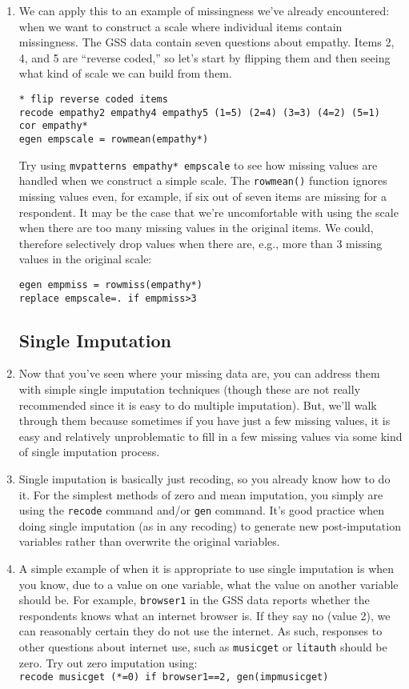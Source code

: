 \documentclass[a4paper,12pt]{article}
\begin{document}
\begin{enumerate}
\item We can apply this to an example of missingness we've already encountered: when we want to construct a scale where individual items contain missingness. The GSS data contain seven questions about empathy. Items 2, 4, and 5 are ``reverse coded,'' so let's start by flipping them and then seeing what kind of scale we can build from them.
\begin{verbatim}
* flip reverse coded items
recode empathy2 empathy4 empathy5 (1=5) (2=4) (3=3) (4=2) (5=1)
cor empathy*
egen empscale = rowmean(empathy*)
\end{verbatim}

Try using \texttt{mvpatterns empathy* empscale} to see how missing values are handled when we construct a simple scale. The \texttt{rowmean()} function ignores missing values even, for example, if six out of seven items are missing for a respondent. It may be the case that we're uncomfortable with using the scale when there are too many missing values in the original items. We could, therefore selectively drop values when there are, e.g., more than 3 missing values in the original scale:
\begin{verbatim}
egen empmiss = rowmiss(empathy*)
replace empscale=. if empmiss>3
\end{verbatim}


\subsection*{Single Imputation}

\item Now that you've seen where your missing data are, you can address them with simple single imputation techniques (though these are not really recommended since it is easy to do multiple imputation). But, we'll walk through them because sometimes if you have just a few missing values, it is easy and relatively unproblematic to fill in a few missing values via some kind of single imputation process.

\item Single imputation is basically just recoding, so you already know how to do it. For the simplest methods of zero and mean imputation, you simply are using the \texttt{recode} command and/or \texttt{gen} command. It's good practice when doing single imputation (as in any recoding) to generate new post-imputation variables rather than overwrite the original variables.

\item A simple example of when it is appropriate to use single imputation is when you know, due to a value on one variable, what the value on another variable should be. For example, \texttt{browser1} in the GSS data reports whether the respondents knows what an internet browser is. If they say no (value 2), we can reasonably certain they do not use the internet. As such, responses to other questions about internet use, such as \texttt{musicget} or \texttt{litauth} should be zero. Try out zero imputation using:\\
\texttt{recode musicget (*=0) if browser1==2, gen(impmusicget)}


\end{enumerate}
\end{document}
